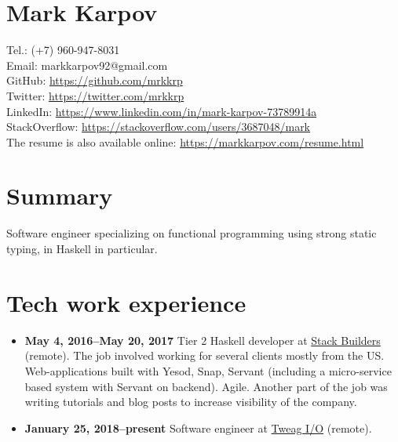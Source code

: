 \documentclass[a4paper,12pt]{article}
\begin{document}

\section*{Mark Karpov}

Tel.: (+7) 960-947-8031\\
Email: markkarpov92@gmail.com\\
GitHub: \href{https://github.com/mrkkrp}{https://github.com/mrkkrp}\\
Twitter: \href{https://twitter.com/mrkkrp}{https://twitter.com/mrkkrp}\\
LinkedIn: \href{https://www.linkedin.com/in/mark-karpov-73789914a}{https://www.linkedin.com/in/mark-karpov-73789914a}\\
StackOverflow: \href{https://stackoverflow.com/users/3687048/mark}{https://stackoverflow.com/users/3687048/mark}\\
The resume is also available online: \href{https://markkarpov.com/resume.html}{https://markkarpov.com/resume.html}

\sectionfont{\fontsize{12}{15}\selectfont\sectionrule{0pt}{0pt}{-5pt}{0.8pt}}

\section*{Summary}

Software engineer specializing on functional programming using strong static
typing, in Haskell in particular.

\section*{Tech work experience}

\begin{itemize}[noitemsep]
\item \textbf{May 4, 2016--May 20, 2017} Tier 2 Haskell developer at
  \href{https://www.stackbuilders.com/}{Stack Builders} (remote). The job
  involved working for several clients mostly from the US. Web-applications
  built with Yesod, Snap, Servant (including a micro-service based system
  with Servant on backend). Agile. Another part of the job was writing
  tutorials and blog posts to increase visibility of the company.
\item \textbf{January 25, 2018--present} Software engineer at
  \href{https://tweag.io}{Tweag I/O} (remote).
\end{itemize}
\end{document}
